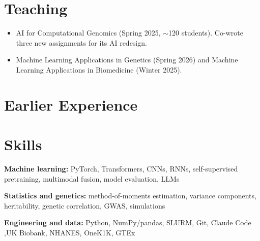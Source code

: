 \documentclass[10pt,letterpaper]{article}
\begin{document}
\section{Teaching}
\begin{itemize}
  \item AI for Computational Genomics (Spring 2025, $\sim$120 students). Co-wrote three new assignments
    for its AI redesign.
  \item Machine Learning Applications in Genetics (Spring 2026) and Machine Learning Applications
    in Biomedicine (Winter 2025).
\end{itemize}

\section{Earlier Experience}

\section{Skills}
\textbf{Machine learning:} PyTorch, Transformers, CNNs, RNNs, self-supervised pretraining, multimodal fusion, model evaluation, LLMs\par
\textbf{Statistics and genetics:} method-of-moments estimation, variance components, heritability, genetic correlation, GWAS,
simulations\par
\textbf{Engineering and data:} Python, NumPy/pandas, SLURM, Git, Claude Code \sep UK Biobank, NHANES, OneK1K, GTEx\par
\end{document}
